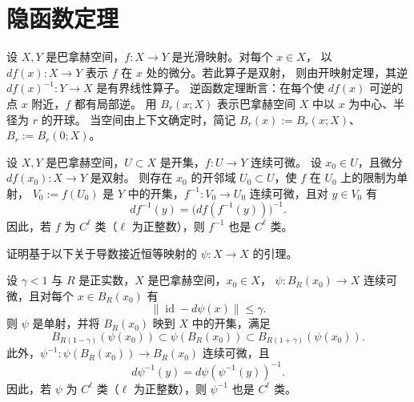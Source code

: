 
\section{隐函数定理}\label{sec:A-3}

设 $X,Y$ 是巴拿赫空间，$f:X\to Y$ 是光滑映射。对每个 $x\in X$，
以 $df(x):X\to Y$ 表示 $f$ 在 $x$ 处的微分。若此算子是双射，
则由开映射定理，其逆 $df(x)^{-1}:Y\to X$ 是有界线性算子。
逆函数定理断言：在每个使 $df(x)$ 可逆的点 $x$ 附近，$f$ 都有局部逆。
用 $B_r(x;X)$ 表示巴拿赫空间 $X$ 中以 $x$ 为中心、半径为 $r$ 的开球。
当空间由上下文确定时，简记 $B_r(x):=B_r(x;X)$、$B_r:=B_r(0;X)$。

\begin{theorem}[逆函数定理]\label{thm:A-3-1}
设 $X,Y$ 是巴拿赫空间，$U\subset X$ 是开集，$f:U\to Y$ 连续可微。
设 $x_0\in U$，且微分 $df(x_0):X\to Y$ 是双射。
则存在 $x_0$ 的开邻域 $U_0\subset U$，使 $f$ 在 $U_0$ 上的限制为单射，
$V_0:=f(U_0)$ 是 $Y$ 中的开集，$f^{-1}:V_0\to U_0$ 连续可微，且对
$y\in V_0$ 有
\[
  df^{-1}(y)=\bigl(df(f^{-1}(y))\bigr)^{-1}.
\]
因此，若 $f$ 为 $C^\ell$ 类（$\ell$ 为正整数），则 $f^{-1}$ 也是 $C^\ell$ 类。
\end{theorem}

证明基于以下关于导数接近恒等映射的 $\psi:X\to X$ 的引理。

\begin{lemma}\label{lem:A-3-2}
设 $\gamma<1$ 与 $R$ 是正实数，$X$ 是巴拿赫空间，$x_0\in X$，
$\psi:B_R(x_0)\to X$ 连续可微，且对每个 $x\in B_R(x_0)$ 有
\[
  \|\operatorname{id}-d\psi(x)\|\le\gamma.
\]
则 $\psi$ 是单射，并将 $B_R(x_0)$ 映到 $X$ 中的开集，满足
\[
  B_{R(1-\gamma)}(\psi(x_0))
  \subset\psi(B_R(x_0))
  \subset B_{R(1+\gamma)}(\psi(x_0)).
\]
此外，$\psi^{-1}:\psi(B_R(x_0))\to B_R(x_0)$ 连续可微，且
\begin{equation}\label{eq:A-3-1}
  d\psi^{-1}(y)=d\psi(\psi^{-1}(y))^{-1}.
\end{equation}
因此，若 $\psi$ 为 $C^\ell$ 类（$\ell$ 为正整数），则 $\psi^{-1}$
也是 $C^\ell$ 类。
\end{lemma}

